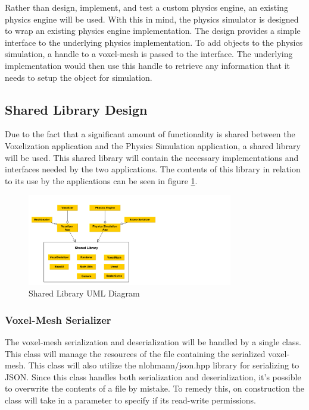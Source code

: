 Rather than design, implement, and test a custom physics engine, an existing physics engine will be
used. With this in mind, the physics simulator is designed to wrap an existing physics engine 
implementation. The design provides a simple interface to the underlying physics implementation. To 
add objects to the physics simulation, a handle to a voxel-mesh is passed to the interface. The 
underlying implementation would then use this handle to retrieve any information that it needs to 
setup the object for simulation. 

\subsection{Shared Library Design} \label{SharedLibrary}

Due to the fact that a significant amount of functionality is shared between the Voxelization
application and the Physics Simulation application, a shared library will be used. This shared
library will contain the necessary implementations and interfaces needed by the two applications. 
The contents of this library in relation to its use by the applications can be seen in figure
\ref{fig:SharedLibraryUML}.

\begin{figure}[h]
  \centering
  \includegraphics[width=0.8\textwidth, trim={0cm 0cm 15cm 0cm}]{SharedLibraryUML}
  \caption{Shared Library UML Diagram}
  \label{fig:SharedLibraryUML}
\end{figure}

\subsubsection{Voxel-Mesh Serializer}
The voxel-mesh serialization and deserialization will be handled by a single class. This class will
manage the resources of the file containing the serialized voxel-mesh. 
This class will also utilize the nlohmann/json.hpp library for serializing to JSON.
Since this class handles both serialization and deserialization, it's possible to overwrite the 
contents of a file by mistake. To remedy this, on construction the class will take in a parameter to 
specify if its read-write permissions. 

